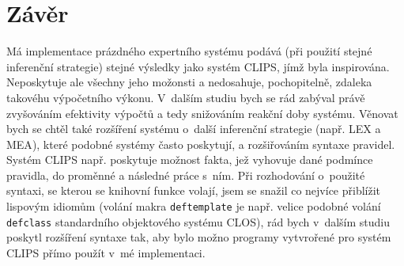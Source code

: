 \section{Závěr}
Má implementace prázdného expertního systému podává (při použití stejné
inferenční strategie) stejné výsledky jako systém \textsf{CLIPS}, jímž byla
inspirována. Neposkytuje ale všechny jeho možonsti a nedosahuje, pochopitelně,
zdaleka takovéhu výpočetního výkonu. V~dalším studiu bych se rád zabýval právě
zvyšováním efektivity výpočtů a tedy snižováním reakční doby systému. Věnovat
bych se chtěl také rozšíření systému o~další inferenční strategie (např.
\textsf{LEX} a \textsf{MEA}), které podobné systémy často poskytují,
a rozšiřováním syntaxe pravidel. Systém \textsf{CLIPS} např. poskytuje
možnost  fakta, jež vyhovuje dané podmínce pravidla, do proměnné
a následné práce s~ním. Při rozhodování o~použité syntaxi, se kterou se
knihovní funkce volají, jsem se snažil co nejvíce přiblížit lispovým idiomům
(volání makra \verb|deftemplate| je např. velice podobné volání \verb|defclass|
standardního objektového systému \textsf{CLOS}),
rád bych v~dalším studiu poskytl rozšíření syntaxe tak, aby bylo možno
programy vytvrořené pro systém \textsf{CLIPS} přímo použít v~mé implementaci.
